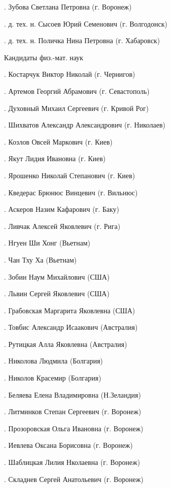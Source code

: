 .	 Зубова Светлана Петровна (г. Воронеж)

.	 д. тех. н. Сысоев Юрий Семенович (г. Волгодонск)

.	 д. тех. н. Поличка Нина Петровна (г. Хабаровск)

                     Кандидаты физ.-мат. наук

.	Костарчук Виктор Николай (г. Чернигов)

.	Артемов Георгий Абрамович (г. Севастополь)

.	Духовный Михаил Сергеевич (г. Кривой Рог)

.	Шихватов Александр Александрович (г. Николаев)

.	Козлов Овсей Маркович (г. Киев)

.	Якут Лидия Ивановна (г. Киев)

.	Ярошенко Николай Степанович (г. Киев)

.	Кведерас Брюнюс Винцевич (г. Вильнюс)

.	Аскеров Назим Кафарович (г. Баку)

.	Ливчак Алексей Яковлевич (г. Рига)

.	Нгуен Ши Хонг   (Вьетнам)

.	Чан Тху Ха (Вьетнам)

.	Зобин Наум Михайлович (США)

.	Львин Сергей Яковлевич (США)

.	Грабовская Маргарита Яковлевна (США)

.	Товбис Александр Исаакович (Австралия)

.	Рутицкая Алла Яковлевна (Австралия)

.	Николова Людмила (Болгария)

.	Николов Красемир (Болгария)

.	Беляева Елена Владимировна (Н.Зеландия)

.	Литминков Степан Сергеевич (г. Воронеж)

.	Прозоровская Ольга Ивановна (г. Воронеж)

.	Иевлева Оксана Борисовна (г. Воронеж)

.	Шаблицкая Лилия Нколаевна (г. Воронеж)

.	Складнев Сергей Анатольевич (г. Воронеж)

